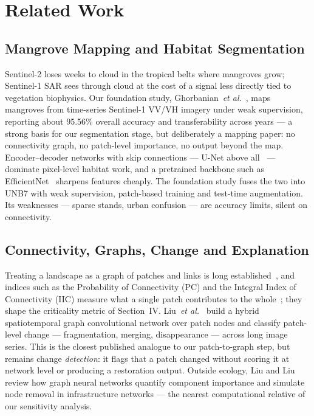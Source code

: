 \documentclass[conference]{IEEEtran}
\begin{document}

\section{Related Work}

\subsection{Mangrove Mapping and Habitat Segmentation}

Sentinel-2 loses weeks to cloud in the tropical belts where mangroves grow; Sentinel-1 SAR sees through cloud at the cost of a signal less directly tied to vegetation biophysics. Our foundation study, Ghorbanian~\emph{et al.}~\cite{ghorbanian2025mangrove}, maps mangroves from time-series Sentinel-1 VV/VH imagery under weak supervision, reporting about 95.56\% overall accuracy and transferability across years --- a strong basis for our segmentation stage, but deliberately a mapping paper: no connectivity graph, no patch-level importance, no output beyond the map. Encoder--decoder networks with skip connections --- U-Net above all~\cite{ronneberger2015unet} --- dominate pixel-level habitat work, and a pretrained backbone such as EfficientNet~\cite{tan2019efficientnet} sharpens features cheaply. The foundation study fuses the two into UNB7 with weak supervision, patch-based training and test-time augmentation. Its weaknesses --- sparse stands, urban confusion --- are accuracy limits, silent on connectivity.

\subsection{Connectivity, Graphs, Change and Explanation}

Treating a landscape as a graph of patches and links is long established~\cite{urban2001landscape}, and indices such as the Probability of Connectivity (PC) and the Integral Index of Connectivity (IIC) measure what a single patch contributes to the whole~\cite{pascualhortal2006comparison,saura2007habitat}; they shape the criticality metric of Section~IV. Liu~\emph{et al.}~\cite{liu2022hybrid} build a hybrid spatiotemporal graph convolutional network over patch nodes and classify patch-level change --- fragmentation, merging, disappearance --- across long image series. This is the closest published analogue to our patch-to-graph step, but remains change \emph{detection}: it flags that a patch changed without scoring it at network level or producing a restoration output. Outside ecology, Liu and Liu~\cite{liu2025gnnresilience} review how graph neural networks quantify component importance and simulate node removal in infrastructure networks --- the nearest computational relative of our sensitivity analysis.
\end{document}
